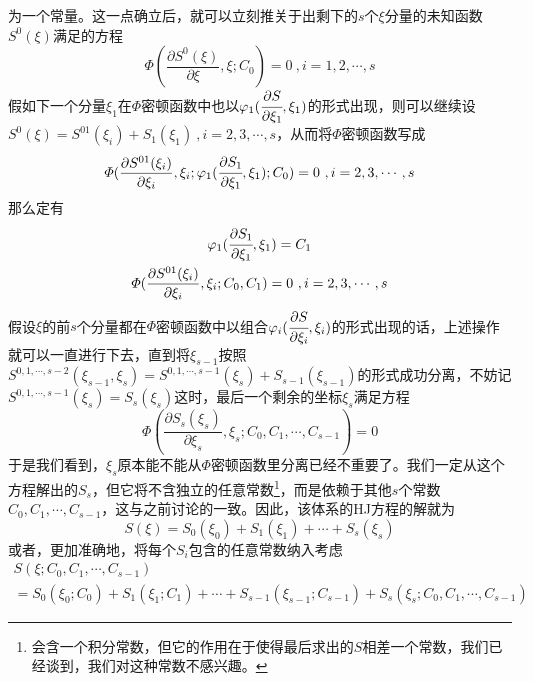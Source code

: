 \documentclass{ctexart}
\begin{document}
为一个常量。这一点确立后，就可以立刻推关于出剩下的$s$个$\xi$分量的未知函数$S^0(\xi)$满足的方程
\begin{equation}
\varPhi (\frac{\partial S^0(\xi)}{\partial \xi},\xi;C_0) = 0\ , i = 1,2,\cdots,s
\end{equation}
假如下一个分量$\xi_1$在$\Phi$密顿函数中也以$\varphi_1(\cfrac{\partial S}{\partial \xi_1},\xi_1)$的形式出现，则可以继续设$S^0(\xi) = S^{01}(\xi_i) +S_1(\xi_1)\ ,i=2,3,\cdots,s$，从而将$\Phi$密顿函数写成
\begin{equation}
\varPhi (\frac{\partial S^{01}(\xi_i)}{\partial \xi_i},\xi_i;\varphi_1(\cfrac{\partial S_1}{\partial \xi_1},\xi_1);C_0) = 0\ , i = 2,3,\cdots,s
\end{equation}
那么定有
\begin{gather}
\varphi_1(\cfrac{\partial S_1}{\partial \xi_1},\xi_1) = C_1 \\
\varPhi (\frac{\partial S^{01}(\xi_i)}{\partial \xi_i},\xi_i;C_0,C_1) = 0\ , i = 2,3,\cdots,s
\end{gather} 
假设$\xi$的前$s$个分量都在$\Phi$密顿函数中以组合$\varphi_i(\cfrac{\partial S}{\partial \xi_i},\xi_i)$的形式出现的话，上述操作就可以一直进行下去，直到将$\xi_{s-1}$按照$S^{0,1,\cdots,s-2}(\xi_{s-1},\xi_s) = S^{0,1,\cdots,s-1}(\xi_s) + S_{s-1}(\xi_{s-1})$的形式成功分离，不妨记$S^{0,1,\cdots,s-1}(\xi_s) = S_s(\xi_s)$这时，最后一个剩余的坐标$\xi_s$满足方程
\begin{equation}
\varPhi ( \frac{\partial S_s(\xi_s)}{\partial \xi_s} , \xi_s ; C_0,C_1,\cdots,C_{s-1}) = 0
\end{equation}
于是我们看到，$\xi_s$原本能不能从$\Phi$密顿函数里分离已经不重要了。我们一定从这个方程解出的$S_s$，但它将不含独立的任意常数\footnote{会含一个积分常数，但它的作用在于使得最后求出的$S$相差一个常数，我们已经谈到，我们对这种常数不感兴趣。}，而是依赖于其他$s$个常数$C_0,C_1,\cdots,C_{s-1}$，这与之前讨论的一致。因此，该体系的HJ方程的解就为
\begin{equation} 
S(\xi) = S_0(\xi_0) + S_1(\xi_1) + \cdots + S_s(\xi_s)
\end{equation}
或者，更加准确地，将每个$S_i$包含的任意常数纳入考虑
\begin{multline} \label{sesol}
S(\xi;C_0,C_1,\cdots,C_{s-1}) \\
= S_0(\xi_0;C_0) + S_1(\xi_1;C_1) + \cdots +S_{s-1}(\xi_{s-1};C_{s-1}) + S_s(\xi_s;C_0,C_1,\cdots,C_{s-1})
\end{multline}
\end{document}
